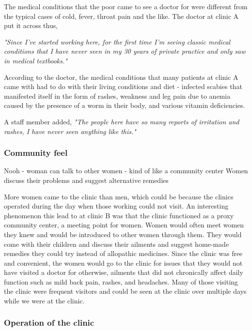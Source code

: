 The medical conditions that the poor came to see a doctor for were different from the typical cases of cold, fever, throat pain and the like. The doctor at clinic A put it across thus,

\textit{"Since I've started working here, for the first time I'm seeing classic medical conditions that I have never seen in my 30 years of private practice and only saw in medical textbooks."}

According to the doctor, the medical conditions that many patients at clinic A came with had to do with their living conditions and diet - infected scabies that manifested itself in the form of rashes, weakness and leg pain due to anemia caused by the presence of a worm in their body, and various vitamin deficiencies.

A staff member added,
\textit{"The people here have so many reports of irritation and rashes, I have never seen anything like this."}

\subsubsection{Community feel}

Nooh - woman can talk to other women - kind of like a community center
Women discuss their problems and suggest alternative remedies

More women came to the clinic than men, which could be because the clinics operated during the day when those working could not visit. An interesting phenomenon this lead to at clinic B was that the clinic functioned as a proxy community center, a meeting point for women. Women would often meet women they knew and would be introduced to other women through them. They would come with their children and discuss their ailments and suggest home-made remedies they could try instead of allopathic medicines. Since the clinic was free and convenient, the women would go to the clinic for issues that they would not have visited a doctor for otherwise, ailments that did not chronically affect daily function such as mild back pain, rashes, and headaches. Many of those visiting the clinic were frequent visitors and could be seen at the clinic over multiple days while we were at the clinic.

\subsubsection{Operation of the clinic}

